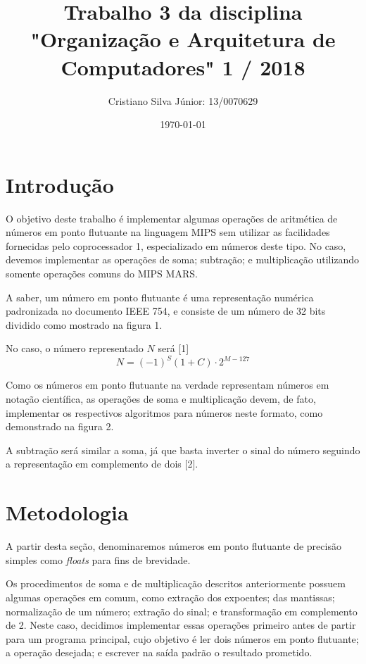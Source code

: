 \documentclass[12pt, a4paper, twoside]{article}
\begin{document}
\title{Trabalho 3 da disciplina "Organização e Arquitetura de Computadores" 1 /
2018}
\author{Cristiano Silva Júnior: 13/0070629}
\date{\today}
\maketitle

\section{Introdução}

O objetivo deste trabalho é implementar algumas operações de aritmética de
números em ponto flutuante na linguagem MIPS sem utilizar as facilidades
fornecidas pelo coprocessador 1, especializado em números deste tipo. No caso,
devemos implementar as operações de soma; subtração; e multiplicação utilizando
somente operações comuns do MIPS MARS.

A saber, um número em ponto flutuante é uma representação numérica padronizada
no documento IEEE 754, e consiste de um número de 32 bits dividido como
mostrado na figura 1.


No caso, o número representado $N$ será [1] $$ N = (-1)^S (1 + C) \cdot 2^{M-127} $$

Como os números em ponto flutuante na verdade representam números em notação
científica, as operações de soma e multiplicação devem, de fato, implementar os
respectivos algoritmos para números neste formato, como demonstrado na figura 2.


A subtração será similar a soma, já que basta inverter o sinal do número
seguindo a representação em complemento de dois [2].

\section{Metodologia}

A partir desta seção, denominaremos números em ponto flutuante de precisão
simples como \textit{floats} para fins de brevidade.

Os procedimentos de soma e de multiplicação descritos anteriormente possuem
algumas operações em comum, como extração dos expoentes; das mantissas;
normalização de um número; extração do sinal; e transformação em complemento
de 2. Neste caso, decidimos implementar essas operações primeiro antes de
partir para um programa principal, cujo objetivo é ler dois números em ponto
flutuante; a operação desejada; e escrever na saída padrão o resultado
prometido.
\end{document}
